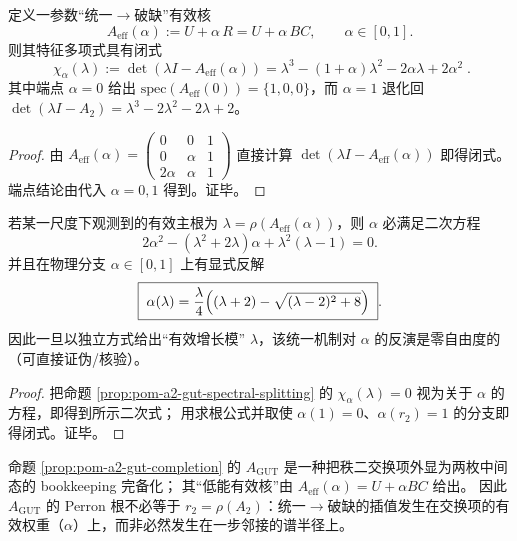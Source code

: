 \begin{proposition}[统一$\to$破缺插值与谱分裂三次族]\label{prop:pom-a2-gut-spectral-splitting}
定义一参数“统一$\to$破缺”有效核
\[
A_{\mathrm{eff}}(\alpha):=U+\alpha\,R=U+\alpha\,BC,\qquad \alpha\in[0,1].
\]
则其特征多项式具有闭式
\[
\boxed{\;
\chi_\alpha(\lambda)
:=\det(\lambda I-A_{\mathrm{eff}}(\alpha))
=
\lambda^3-(1+\alpha)\lambda^2-2\alpha\lambda+2\alpha^2\; }.
\]
其中端点 \(\alpha=0\) 给出 \(\mathrm{spec}(A_{\mathrm{eff}}(0))=\{1,0,0\}\)，而 \(\alpha=1\) 退化回
\(\det(\lambda I-A_2)=\lambda^3-2\lambda^2-2\lambda+2\)。
\end{proposition}
\begin{proof}
由
\(
A_{\mathrm{eff}}(\alpha)=\begin{pmatrix}0&0&1\\0&\alpha&1\\2\alpha&\alpha&1\end{pmatrix}
\)
直接计算 \(\det(\lambda I-A_{\mathrm{eff}}(\alpha))\) 即得闭式。
端点结论由代入 \(\alpha=0,1\) 得到。证毕。
\end{proof}

\begin{corollary}\label{cor:pom-a2-gut-invert-alpha}
若某一尺度下观测到的有效主根为 \(\lambda=\rho(A_{\mathrm{eff}}(\alpha))\)，则 \(\alpha\) 必满足二次方程
\[
2\alpha^2-(\lambda^2+2\lambda)\alpha+\lambda^2(\lambda-1)=0.
\]
并且在物理分支 \(\alpha\in[0,1]\) 上有显式反解
\[
\boxed{\;
\alpha(\lambda)=\frac{\lambda}{4}\Bigl((\lambda+2)-\sqrt{(\lambda-2)^2+8}\Bigr)\; }.
\]
因此一旦以独立方式给出“有效增长模” \(\lambda\)，该统一机制对 \(\alpha\) 的反演是零自由度的（可直接证伪/核验）。
\end{corollary}
\begin{proof}
把命题 \ref{prop:pom-a2-gut-spectral-splitting} 的 \(\chi_\alpha(\lambda)=0\) 视为关于 \(\alpha\) 的方程，即得到所示二次式；
用求根公式并取使 \(\alpha(1)=0\)、\(\alpha(r_2)=1\) 的分支即得闭式。证毕。
\end{proof}

\begin{remark}[“母核”与一步谱半径的区分]\label{rem:pom-a2-gut-mother-vs-effective}
命题 \ref{prop:pom-a2-gut-completion} 的 \(A_{\mathrm{GUT}}\) 是一种把秩二交换项外显为两枚中间态的 bookkeeping 完备化；
其“低能有效核”由 \(A_{\mathrm{eff}}(\alpha)=U+\alpha BC\) 给出。
因此 \(A_{\mathrm{GUT}}\) 的 Perron 根不必等于 \(r_2=\rho(A_2)\)：统一$\to$破缺的插值发生在交换项的有效权重（\(\alpha\)）上，而非必然发生在一步邻接的谱半径上。
\end{remark}

